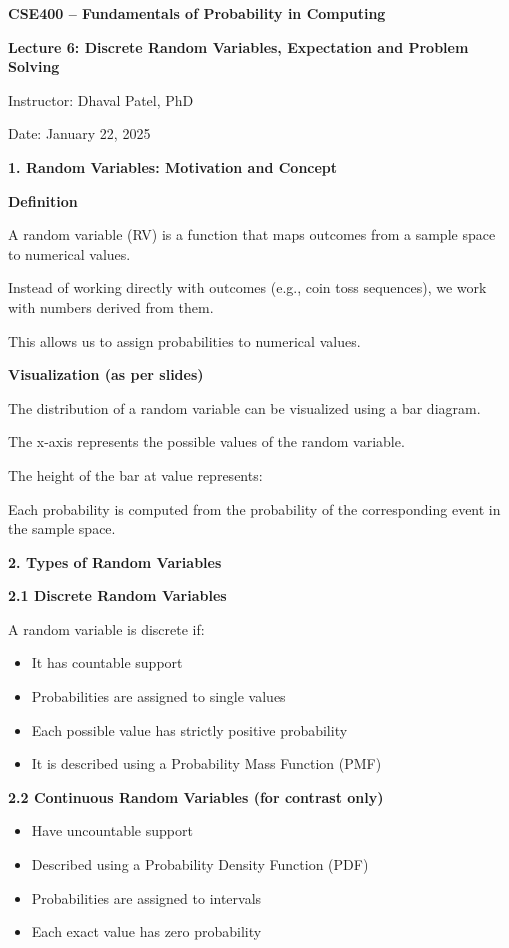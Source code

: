 \documentclass[12pt]{article}
\begin{document}
\textbf{CSE400 – Fundamentals of Probability in Computing}

\textbf{Lecture 6: Discrete Random Variables, Expectation and Problem Solving}

Instructor: Dhaval Patel, PhD

Date: January 22, 2025

\vspace{1em}

\textbf{1. Random Variables: Motivation and Concept}

\textbf{Definition}

A random variable (RV) is a function that maps outcomes from a sample space to numerical values.

Instead of working directly with outcomes (e.g., coin toss sequences), we work with numbers derived from them.

This allows us to assign probabilities to numerical values.

\textbf{Visualization (as per slides)}

The distribution of a random variable can be visualized using a bar diagram.

The x-axis represents the possible values of the random variable.

The height of the bar at value represents:

Each probability is computed from the probability of the corresponding event in the sample space.

\vspace{0.5em}

\textbf{2. Types of Random Variables}

\textbf{2.1 Discrete Random Variables}

A random variable is discrete if:
\begin{itemize}[leftmargin=2em]
\item It has countable support
\item Probabilities are assigned to single values
\item Each possible value has strictly positive probability
\item It is described using a Probability Mass Function (PMF)
\end{itemize}

\textbf{2.2 Continuous Random Variables (for contrast only)}

\begin{itemize}[leftmargin=2em]
\item Have uncountable support
\item Described using a Probability Density Function (PDF)
\item Probabilities are assigned to intervals
\item Each exact value has zero probability
\end{itemize}
\end{document}
